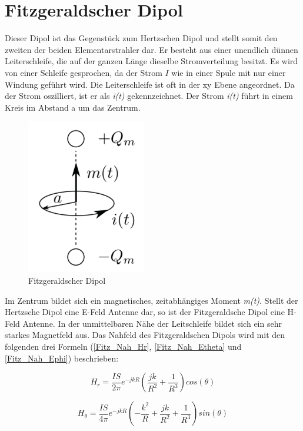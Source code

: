 \section{Fitzgeraldscher Dipol }\label{sec:FitzgeraldescherDipol}
Dieser Dipol ist das Gegenstück zum Hertzschen Dipol und stellt somit den zweiten der beiden Elementarstrahler dar. Er besteht aus einer unendlich dünnen Leiterschleife, die auf der ganzen Länge dieselbe Stromverteilung besitzt. Es wird von einer Schleife gesprochen, da der Strom $I$ wie in einer Spule mit nur einer Windung geführt wird. Die Leiterschleife ist oft in der xy Ebene angeordnet. Da der Strom oszilliert, ist er als \textit{i(t)} gekennzeichnet. Der Strom \textit{i(t)} führt in einem Kreis im Abstand a um das Zentrum.
\begin{figure}[!h]
	\centering
	\includegraphics[width=5.2cm]{content/bilder/Fitzgerald_Dipol_EMANT_S37.pdf}%
	\caption{Fitzgeraldscher Dipol \cite{Emant}}
	\label{FitzDipol_elementar_Loop}
\end{figure}
\newpage
Im Zentrum bildet sich ein magnetisches, zeitabhängiges Moment \textit{m(t)}. Stellt der Hertzsche Dipol eine E-Feld Antenne dar, so ist der Fitzgeraldsche Dipol eine H-Feld Antenne. In der unmittelbaren Nähe der Leitschleife bildet sich ein sehr starkes Magnetfeld aus. Das Nahfeld des Fitzgeraldschen Dipols wird mit den folgenden drei Formeln (\ref{Fitz_Nah_Hr}, \ref{Fitz_Nah_Etheta} und \ref{Fitz_Nah_Ephi}) beschrieben\cite{elliott1981antenna}:


\begin{equation}
H_r= \frac{I S}{2\pi}   e^{-jkR} \left( \frac{jk}{R^{2}}  + \frac{1}{R^{3}} \right) cos(\theta)
\label{Fitz_Nah_Hr}
\end{equation}

\begin{equation}
H_\theta= \frac{I S}{4\pi}   e^{-jkR} \left(- \frac{k^{2}}{R}  + \frac{jk}{R^{2}}+ \frac{1}{R^{3}} \right) sin(\theta)
\label{Fitz_Nah_Etheta}
\end{equation}

